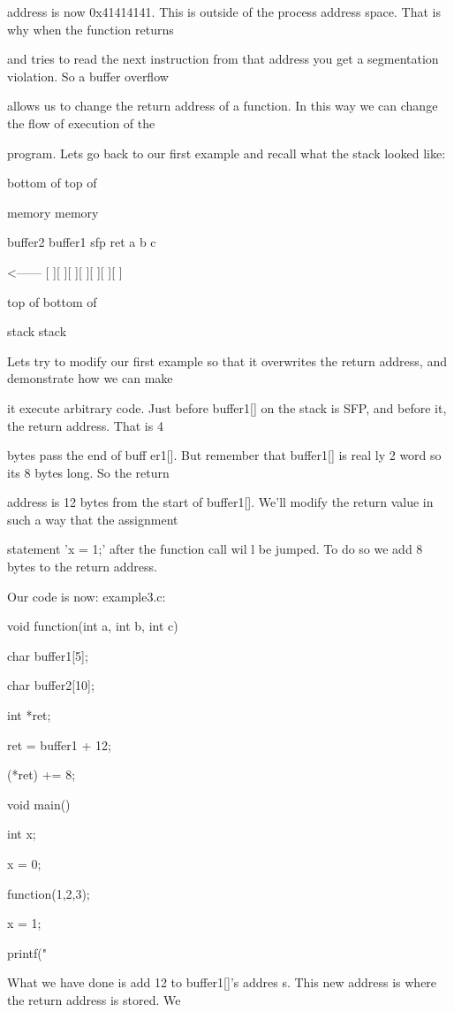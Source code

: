 \documentclass[10pt]{article}
\begin{document}
address is now 0x41414141. This is outside of the process address space.  That is why when the function returns 

and tries to read the next instruction from that address you get a segmentation violation. So a buffer overflow 

allows us to change the return address of a function. In this way we can change the flow of execution of the 

program. Lets go back to our first example and recall what the stack looked like: 

bottom of                                                            top of

memory                                                               memory

           buffer2       buffer1   sfp   ret   a     b     c

<------   [            ][        ][    ][    ][    ][    ][    ]

top of                                                            bottom of

stack                                                                 stack

Lets try to modify our first example so that it overwrites the return address, and demonstrate how we can make 

it execute arbitrary code. Just before buffer1[] on the stack is SFP, and before it, the return address. That is 4 

bytes pass the end of buff er1[]. But remember that buffer1[] is real ly 2 word so its 8 bytes long. So the return 

address is 12 bytes from the start of buffer1[]. We'll modify the return value in such a way that the assignment 

statement 'x = 1;' after the function call wil l be jumped. To do so we add 8 bytes to the return address. 

Our code is now: example3.c:

void function(int a, int b, int c) {

   char buffer1[5];

   char buffer2[10];

   int *ret;

   ret = buffer1 + 12;

   (*ret) += 8;

}

void main() {

  int x;

  x = 0;

  function(1,2,3);

  x = 1;

  printf("%

}What we have done is add 12 to buffer1[]'s addres s. This new address is where the return address is stored. We 
\end{document}
